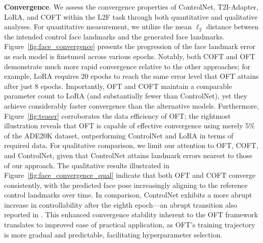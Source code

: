 \textbf{Convergence}. We assess the convergence properties of ControlNet, T2I-Adapter, LoRA, and COFT within the L2F task through both quantitative and qualitative analyses. For quantitative measurement, we utilize the mean $\ell_2$ distance between the intended control face landmarks and the generated face landmarks. Figure~\ref{fig:face_convergence} presents the progression of the face landmark error as each model is finetuned across various epochs. Notably, both COFT and OFT demonstrate much more rapid convergence relative to the other approaches; for example, LoRA requires 20 epochs to reach the same error level that OFT attains after just 8 epochs. Importantly, OFT and COFT maintain a comparable parameter count to LoRA (and substantially fewer than ControlNet), yet they achieve considerably faster convergence than the alternative models. Furthermore, Figure~\ref{fig:teaser} corroborates the data efficiency of OFT; the rightmost illustration reveals that OFT is capable of effective convergence using merely 5\% of the ADE20K dataset, outperforming ControlNet and LoRA in terms of required data. For qualitative comparison, we limit our attention to OFT, COFT, and ControlNet, given that ControlNet attains landmark errors nearest to those of our approach. The qualitative results illustrated in Figure~\ref{fig:face_convergence_qual} indicate that both OFT and COFT converge consistently, with the predicted face pose increasingly aligning to the reference control landmarks over time. In comparison, ControlNet exhibits a more abrupt increase in controllability after the eighth epoch—an abrupt transition also reported in \cite{zhang2023adding}. This enhanced convergence stability inherent to the OFT framework translates to improved ease of practical application, as OFT's training trajectory is more gradual and predictable, facilitating hyperparameter selection.

